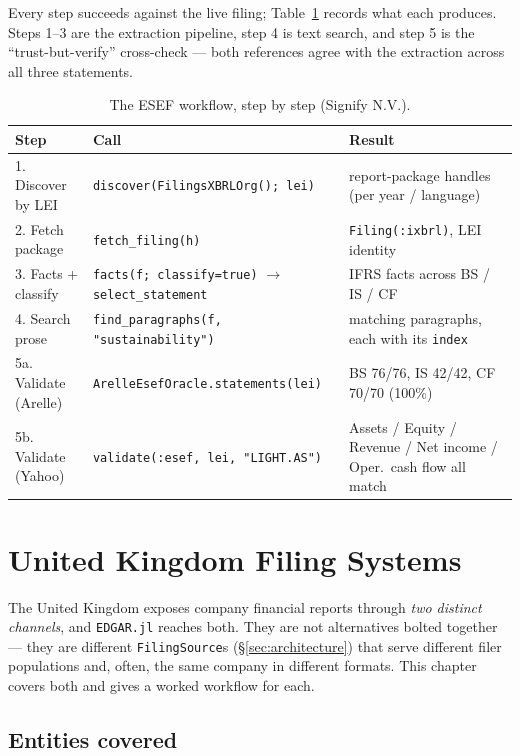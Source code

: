 \documentclass[11pt,a4paper]{report}
\begin{document}
\noindent Every step succeeds against the live filing; Table~\ref{tab:esef-lifecycle} records what each
produces. Steps 1--3 are the extraction pipeline, step 4 is text search, and step 5 is the
``trust-but-verify'' cross-check --- both references agree with the extraction across all three statements.

\begin{table}[h]
\centering
\caption{The ESEF workflow, step by step (Signify N.V.).}
\label{tab:esef-lifecycle}
\begin{tabular}{@{}p{}p{}p{}@{}}
\toprule
\textbf{Step} & \textbf{Call} & \textbf{Result} \\
\midrule
1. Discover by LEI         & \texttt{discover(FilingsXBRLOrg(); lei)}        & report-package handles (per year / language) \\
2. Fetch package           & \texttt{fetch\_filing(h)}                       & \texttt{Filing(:ixbrl)}, LEI identity \\
3. Facts + classify        & \texttt{facts(f; classify=true)} $\to$ \texttt{select\_statement} & IFRS facts across BS / IS / CF \\
4. Search prose            & \texttt{find\_paragraphs(f, "sustainability")} & matching paragraphs, each with its \texttt{index} \\
5a. Validate (Arelle)      & \texttt{ArelleEsefOracle.statements(lei)}           & BS 76/76, IS 42/42, CF 70/70 (100\%) \\
5b. Validate (Yahoo)       & \texttt{validate(:esef, lei, "LIGHT.AS")} & Assets / Equity / Revenue / Net income / Oper.\ cash flow all match \\
\bottomrule
\end{tabular}
\end{table}


\chapter{United Kingdom Filing Systems}
\label{sys:uk}

The United Kingdom exposes company financial reports through \emph{two distinct channels}, and
\texttt{EDGAR.jl} reaches both. They are not alternatives bolted together --- they are different
\texttt{FilingSource}s (\S\ref{sec:architecture}) that serve different filer populations and, often,
the same company in different formats. This chapter covers both and gives a worked workflow for each.

\section{Entities covered}
\label{sec:uk-channels}
\end{document}
